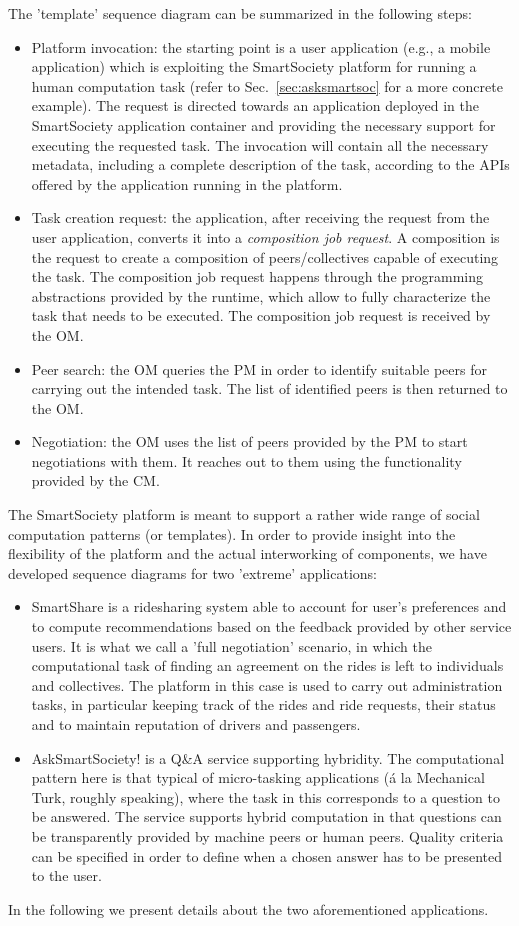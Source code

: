 The 'template' sequence diagram can be summarized in the following steps:
\begin{itemize}
\item Platform invocation: the starting point is a user application (e.g., a mobile application) which is exploiting the SmartSociety platform for running a human computation task (refer to Sec.~\ref{sec:asksmartsoc} for a more concrete example). The request is directed towards an application deployed in the SmartSociety application container and providing the necessary support for executing the requested task. The invocation will contain all the necessary metadata, including a complete description of the task, according to the APIs offered by the application running in the platform.
\item Task creation request: the application, after receiving the request from the user application, converts it into a \textit{composition job request}. A composition is the request to create a composition of peers/collectives capable of executing the task. The composition job request happens through the programming abstractions provided by the runtime, which allow to fully characterize the task that needs to be executed. The composition job request is received by the OM. 
\item Peer search: the OM queries the PM in order to identify suitable peers for carrying out the intended task. The list of identified peers is then returned to the OM.
\item Negotiation: the OM uses the list of peers provided by the PM to start negotiations with them. It reaches out to them using the functionality provided by the CM. 


\end{itemize}


The SmartSociety platform is meant to support a rather wide range of
social computation patterns (or templates). In order to provide
insight into the flexibility of the platform and the actual
interworking of components, we have developed sequence diagrams for two
'extreme' applications:
\begin{itemize}
\item SmartShare is a ridesharing system able to account for user's
preferences and to compute recommendations based on the feedback
provided by other service users. It is what we call a 'full
negotiation' scenario, in which the computational task of finding an
agreement on the rides is left to individuals and collectives. The
platform in this case is used to carry out administration tasks, in
particular keeping track of the rides and ride requests, their status
and to maintain reputation of drivers and passengers.
\item AskSmartSociety! is a Q\&A service supporting hybridity. The
computational pattern here is that typical of micro-tasking
applications (\'a la Mechanical Turk, roughly speaking), where the
task in this corresponds to a question to be answered. The service
supports hybrid computation in that questions can be transparently
provided by machine peers or human peers. Quality criteria can be
specified in order to define when a chosen answer has to be presented
to the user. 
\end{itemize}
In the following we present details about the two aforementioned
applications. 
